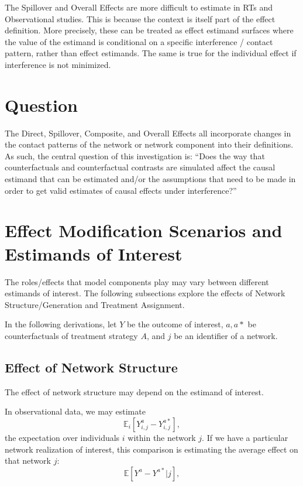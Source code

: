 \documentclass{article}
\theoremstyle{definition}
\begin{document}
The Spillover and Overall Effects are more difficult to estimate in RTs and Observational studies. This is because the context is itself part of the effect definition. More precisely, these can be treated as effect estimand surfaces where the value of the estimand is conditional on a specific interference / contact pattern, rather than effect estimands. The same is true for the individual effect if interference is not minimized.

\section{Question}
The Direct, Spillover, Composite, and Overall Effects all incorporate changes in the contact patterns of the network or network component into their definitions. As such, the central question of this investigation is: ``Does the way that counterfactuals and counterfactual contrasts are simulated affect the causal estimand that can be estimated and/or the assumptions that need to be made in order to get valid estimates of causal effects under interference?''

\section{Effect Modification Scenarios and Estimands of Interest}
The roles/effects that model components play may vary between different estimands of interest. The following subsections explore the effects of Network Structure/Generation and Treatment Assignment. 

In the following derivations, let $Y$ be the outcome of interest, $a,a*$ be counterfactuals of treatment strategy $A$, and $j$ be an identifier of a network.
\subsection{Effect of Network Structure}
The effect of network structure may depend on the estimand of interest. 

In observational data, we may estimate
\begin{equation}\label{eq:1}
    \mathbb{E}_{i}\left[Y_{i,j}^{a}-Y_{i,j}^{a*}\right],
\end{equation}
the expectation over individuals $i$ within the network $j$. If we have a particular network realization of interest, this comparison is estimating the average effect on that network $j$: 
\begin{equation}\label{eq:2}
    \mathbb{E}\left[Y^{a}-Y^{a*}|j\right],
\end{equation}
\end{document}

